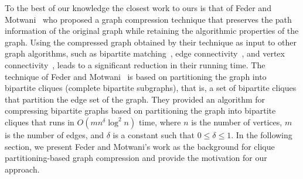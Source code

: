 To the best of our knowledge the closest work to ours is that of Feder and Motwani~\cite{federMotwani} who proposed a graph compression technique that preserves the path information of the original graph while retaining the algorithmic properties of the graph. Using the compressed graph obtained by their technique as input to other graph algorithms, such as bipartite matching~\cite{Hopcroft:sjc73}, edge connectivity~\cite{Matula:focs87}, and vertex connectivity~\cite{Even:siam-jc75}, leads to a significant reduction in their running time.
The technique of Feder and Motwani~\cite{federMotwani} is based on partitioning the graph into bipartite cliques (complete bipartite subgraphs),
that is, a set of bipartite cliques  that partition the edge set of the graph.
They provided an algorithm for compressing bipartite graphs based on partitioning the graph into bipartite cliques that runs in $O(mn^{\delta} \log^2 n)$ time, where $n$ is the number of vertices, $m$ is the number of edges, and $\delta$ is a constant such that $0\leq \delta \leq 1$. 
In the following section, we present Feder and Motwani's work as the background for clique partitioning-based graph compression and provide the motivation for our approach. 